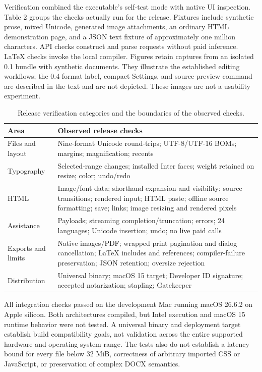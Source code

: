 \documentclass[manuscript,screen,nonacm]{acmart}
\begin{document}
Verification combined the executable's self-test mode with native UI inspection. Table 2 groups the checks actually run for the release. Fixtures include synthetic prose, mixed Unicode, generated image attachments, an ordinary HTML demonstration page, and a JSON text fixture of approximately one million characters. API checks construct and parse requests without paid inference. LaTeX checks invoke the local compiler. Figures retain captures from an isolated 0.1 bundle with synthetic documents. They illustrate the established editing workflows; the 0.4 format label, compact Settings, and source-preview command are described in the text and are not depicted. These images are not a usability experiment.

\begin{table}[tbp]
\caption{Release verification categories and the boundaries of the observed checks.}
\small
\begin{tabularx}{\linewidth}{lX}
\toprule
Area & Observed release checks \\
\midrule
Files and layout & Nine-format Unicode round-trips; UTF-8/UTF-16 BOMs; margins; magnification; recents \\
Typography & Selected-range changes; installed Inter faces; weight retained on resize; color; undo/redo \\
HTML & Image/font data; shorthand expansion and visibility; source transitions; rendered input; HTML paste; offline source formatting; save; links; image resizing and rendered pixels \\
Assistance & Payloads; streaming completion/truncation; errors; 24 languages; Unicode insertion; undo; no live paid calls \\
Exports and limits & Native images/PDF; wrapped print pagination and dialog cancellation; LaTeX includes and references; compiler-failure preservation; JSON retention; oversize rejection \\
Distribution & Universal binary; macOS 15 target; Developer ID signature; accepted notarization; stapling; Gatekeeper \\
\bottomrule
\end{tabularx}
\end{table}

All integration checks passed on the development Mac running macOS 26.6.2 on Apple silicon. Both architectures compiled, but Intel execution and macOS 15 runtime behavior were not tested. A universal binary and deployment target establish build compatibility goals, not validation across the entire supported hardware and operating-system range. The tests also do not establish a latency bound for every file below 32 MiB, correctness of arbitrary imported CSS or JavaScript, or preservation of complex DOCX semantics.
\end{document}
